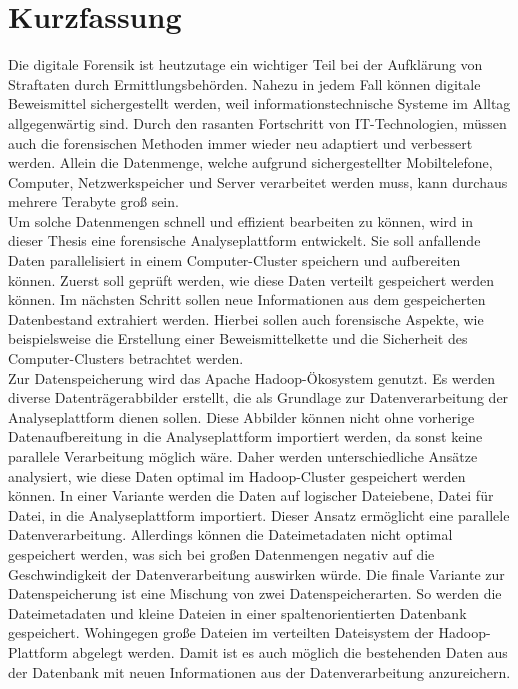 %
\section*{Kurzfassung}
Die digitale Forensik ist heutzutage ein wichtiger Teil bei der Aufklärung von Straftaten durch Ermittlungsbehörden. Nahezu in jedem Fall können digitale Beweismittel sichergestellt werden, weil informationstechnische Systeme im Alltag allgegenwärtig sind. Durch den rasanten Fortschritt von IT-Technologien, müssen auch die forensischen Methoden immer wieder neu adaptiert und verbessert werden. Allein die Datenmenge, welche aufgrund sichergestellter Mobiltelefone, Computer, Netzwerkspeicher und Server verarbeitet werden muss, kann durchaus mehrere Terabyte groß sein.\\
Um solche Datenmengen schnell und effizient bearbeiten zu können, wird in dieser Thesis eine forensische Analyseplattform entwickelt. Sie soll anfallende Daten parallelisiert in einem Computer-Cluster speichern und aufbereiten können. Zuerst soll geprüft werden, wie diese Daten verteilt gespeichert werden können. Im nächsten Schritt sollen neue Informationen aus dem gespeicherten Datenbestand extrahiert werden. Hierbei sollen auch forensische Aspekte, wie beispielsweise die Erstellung einer Beweismittelkette und die Sicherheit des Computer-Clusters betrachtet werden.\\

\noindent
Zur Datenspeicherung wird das Apache Hadoop\textsuperscript{\textregistered}-Ökosystem genutzt. Es werden diverse Datenträgerabbilder erstellt, die als Grundlage zur Datenverarbeitung der Analyseplattform dienen sollen. Diese Abbilder können nicht ohne vorherige Datenaufbereitung in die Analyseplattform importiert werden, da sonst keine parallele Verarbeitung möglich wäre. Daher werden unterschiedliche Ansätze analysiert, wie diese Daten optimal im Hadoop-Cluster gespeichert werden können. In einer Variante werden die Daten auf logischer Dateiebene, Datei für Datei, in die Analyseplattform importiert. Dieser Ansatz ermöglicht eine parallele Datenverarbeitung. Allerdings können die Dateimetadaten nicht optimal gespeichert werden, was sich bei großen Datenmengen negativ auf die Geschwindigkeit der Datenverarbeitung auswirken würde.
Die finale Variante zur Datenspeicherung ist eine Mischung von zwei Datenspeicherarten. So werden die Dateimetadaten und kleine Dateien in einer spaltenorientierten Datenbank gespeichert. Wohingegen große Dateien im verteilten Dateisystem der Hadoop-Plattform abgelegt werden. Damit ist es auch möglich die bestehenden Daten aus der Datenbank mit neuen Informationen aus der Datenverarbeitung anzureichern.\\

